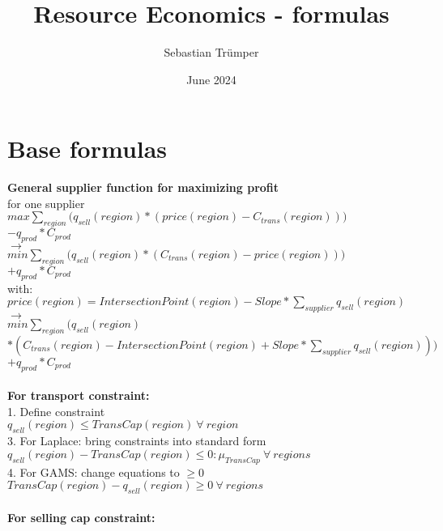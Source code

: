 \documentclass{article}
\title{Resource Economics - formulas}
\author{Sebastian Trümper}
\date{June 2024}
\begin{document}
\maketitle

\section{Base formulas}
\textbf{General supplier function for maximizing profit}\\
for one  supplier\\
\quad$max \sum_{region} \Big(q_{sell}(region) * (price(region) - C_{trans}(region))\Big) $\\
\quad$- q_{prod}*C_{prod}$\\
$\rightarrow$\\
\quad$min \sum_{region} \Big(q_{sell}(region) *(C_{trans}(region) - price(region)) \Big) $\\
\quad$+ q_{prod}*C_{prod}$\\

with: \\
\quad$price(region) = IntersectionPoint(region) - Slope * \sum_{supplier} q_{sell}(region)$\\

$\rightarrow$\\
\quad$min \sum_{region}\Big( q_{sell}(region) $\\
\quad$*(C_{trans}(region) - IntersectionPoint(region) + Slope * \sum_{supplier} q_{sell}(region))\Big) $\\
\quad$+ q_{prod}*C_{prod}$\\


\hfill\\
\textbf{For	transport constraint: }\\

1. Define constraint\\
\quad$q_{sell}(region) \leq TransCap(region)\: \forall \: region$\\
3. For Laplace: bring constraints into standard form\\
\quad$q_{sell}(region) - TransCap(region) \leq 0  : \mu_{TransCap}\: \forall \: regions$\\
4. For GAMS: change equations to $\geq 0$\\
\quad$TransCap(region) - q_{sell}(region) \geq 0 \: \forall \: regions$\\

\hfill\\
\textbf{For	selling cap constraint: }\\
\end{document}
